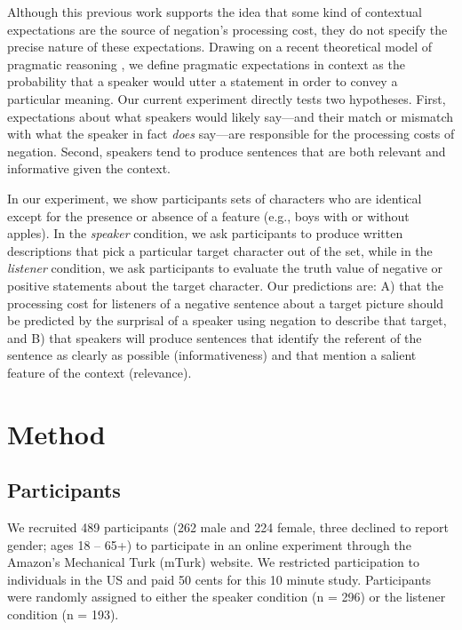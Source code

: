 \documentclass[man, noapacite]{apa2}
\begin{document}
Although this previous work supports the idea that some kind of contextual expectations are the source of negation's processing cost, they do not specify the precise nature of these expectations. Drawing on a recent theoretical model of pragmatic reasoning \cite{frank2012}, we define pragmatic expectations in context as the probability that a speaker would utter a statement in order to convey a particular meaning. Our current experiment directly tests two hypotheses. First, expectations about what speakers would likely say---and their match or mismatch with what the speaker in fact \emph{does} say---are responsible for the processing costs of negation. Second, speakers tend to produce sentences that are both relevant and informative given the context.

In our experiment, we show participants sets of characters who are identical except for the presence or absence of a feature (e.g., boys with or without apples). In the \emph{speaker} condition, we ask participants to produce written descriptions that pick a particular target character out of the set, while in the \emph{listener} condition, we ask participants to evaluate the truth value of negative or positive statements about the target character. Our predictions are: A) that the processing cost for listeners of a negative sentence about a target picture should be predicted by the surprisal \cite{levy2008} of a speaker using negation to describe that target, and B) that speakers will produce sentences that identify the referent of the sentence as clearly as possible (informativeness) and that mention a salient feature of the context (relevance).  

\section{Method}

\subsection{Participants} 

We recruited 489 participants (262 male and 224 female, three declined to report gender; ages 18 -- 65+) to participate in an online experiment through the Amazon's Mechanical Turk (mTurk) website.  We restricted participation to individuals in the US and paid 50 cents for this 10 minute study.  Participants were randomly assigned to either the speaker condition (n = 296) or the listener condition (n = 193).
\end{document}
